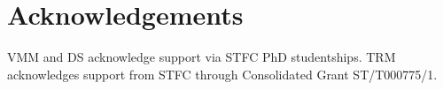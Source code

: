 \documentclass[11pt,a4paper]{article}
\numberwithin{figure}{section}
\numberwithin{equation}{section}
\begin{document}
 \section{Acknowledgements}
VMM and DS acknowledge support via STFC PhD studentships. TRM acknowledges support from STFC through Consolidated Grant ST/T000775/1.






%




\end{document}
